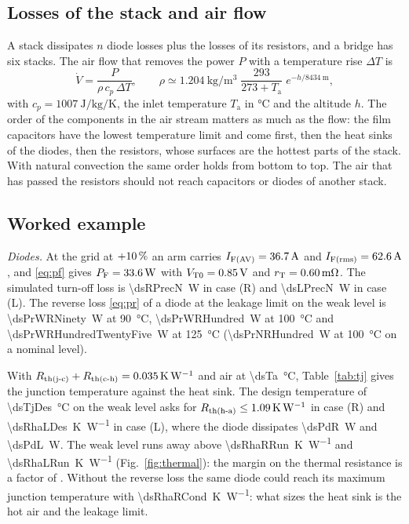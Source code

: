 \documentclass[10pt,a4paper]{scrartcl}
\newcommand{\Rthha}{R_\mathrm{th(h\text{-}a)}}
\newcommand{\caseR}{(R)}
\newcommand{\caseL}{(L)}
\begin{document}
\subsection{Losses of the stack and air flow}
A stack dissipates $n$ diode losses plus the losses of its resistors, and a bridge has six stacks. The air flow that removes the power $P$ with a temperature rise $\Delta T$ is
\begin{equation}
\dot V = \frac{P}{\rho\,c_p\,\Delta T}, \qquad \rho \simeq \SI{1.204}{\kilo\gram\per\cubic\metre}\;\frac{293}{273 + T_\mathrm{a}}\;e^{-h/\SI{8434}{\metre}} ,
\label{eq:flow}
\end{equation}
with $c_p = \SI{1007}{\joule\per\kilo\gram\per\kelvin}$, the inlet temperature $T_\mathrm{a}$ in \si{\celsius} and the altitude $h$. The order of the components in the air stream matters as much as the flow: the film capacitors have the lowest temperature limit and come first, then the heat sinks of the diodes, then the resistors, whose surfaces are the hottest parts of the stack. With natural convection the same order holds from bottom to top. The air that has passed the resistors should not reach capacitors or diodes of another stack.

\subsection{Worked example}
\label{sec:ex-thermal}
\emph{Diodes.} At the grid at $+10\,\%$ an arm carries $I_\mathrm{F(AV)} = \SI{36.7}{\ampere}$ and $I_\mathrm{F(rms)} = \SI{62.6}{\ampere}$, and \eqref{eq:pf} gives $P_\mathrm{F} = \SI{33.6}{\watt}$ with $V_\mathrm{T0} = \SI{0.85}{\volt}$ and $r_\mathrm{T} = \SI{0.60}{\milli\ohm}$. The simulated turn-off loss is \SI{\dsRPrecN}{\watt} in case \caseR{} and \SI{\dsLPrecN}{\watt} in case \caseL{}. The reverse loss \eqref{eq:pr} of a diode at the leakage limit on the weak level is \SI{\dsPrWRNinety}{\watt} at \SI{90}{\celsius}, \SI{\dsPrWRHundred}{\watt} at \SI{100}{\celsius} and \SI{\dsPrWRHundredTwentyFive}{\watt} at \SI{125}{\celsius} (\SI{\dsPrNRHundred}{\watt} at \SI{100}{\celsius} on a nominal level).

With $R_\mathrm{th(j\text{-}c)} + R_\mathrm{th(c\text{-}h)} = \SI{0.035}{\kelvin\per\watt}$ and air at \SI{\dsTa}{\celsius}, Table~\ref{tab:tj} gives the junction temperature against the heat sink. The design temperature of \SI{\dsTjDes}{\celsius} on the weak level asks for $\Rthha \le \SI{\dsRhaRDes}{\kelvin\per\watt}$ in case \caseR{} and \SI{\dsRhaLDes}{\kelvin\per\watt} in case \caseL{}, where the diode dissipates \SI{\dsPdR}{\watt} and \SI{\dsPdL}{\watt}. The weak level runs away above \SI{\dsRhaRRun}{\kelvin\per\watt} and \SI{\dsRhaLRun}{\kelvin\per\watt} (Fig.~\ref{fig:thermal}): the margin on the thermal resistance is a factor of \dsRhaRRatio{}. Without the reverse loss the same diode could reach its maximum junction temperature with \SI{\dsRhaRCond}{\kelvin\per\watt}: what sizes the heat sink is the hot air and the leakage limit.
\end{document}
